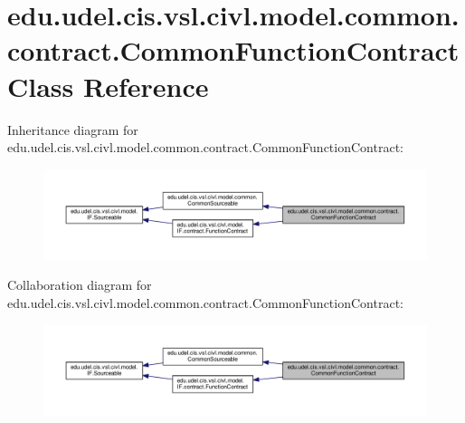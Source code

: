\hypertarget{classedu_1_1udel_1_1cis_1_1vsl_1_1civl_1_1model_1_1common_1_1contract_1_1CommonFunctionContract}{}\section{edu.\+udel.\+cis.\+vsl.\+civl.\+model.\+common.\+contract.\+Common\+Function\+Contract Class Reference}
\label{classedu_1_1udel_1_1cis_1_1vsl_1_1civl_1_1model_1_1common_1_1contract_1_1CommonFunctionContract}


Inheritance diagram for edu.\+udel.\+cis.\+vsl.\+civl.\+model.\+common.\+contract.\+Common\+Function\+Contract\+:
\nopagebreak
\begin{figure}[H]
\begin{center}
\leavevmode
\includegraphics[width=350pt]{classedu_1_1udel_1_1cis_1_1vsl_1_1civl_1_1model_1_1common_1_1contract_1_1CommonFunctionContract__inherit__graph}
\end{center}
\end{figure}


Collaboration diagram for edu.\+udel.\+cis.\+vsl.\+civl.\+model.\+common.\+contract.\+Common\+Function\+Contract\+:
\nopagebreak
\begin{figure}[H]
\begin{center}
\leavevmode
\includegraphics[width=350pt]{classedu_1_1udel_1_1cis_1_1vsl_1_1civl_1_1model_1_1common_1_1contract_1_1CommonFunctionContract__coll__graph}
\end{center}
\end{figure}
